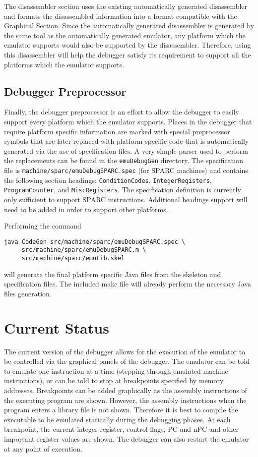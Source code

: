 The disassembler section uses the existing automatically generated disassembler 
and formats the disassembled information into a format compatible with the 
Graphical Section. Since the automatically generated disassembler is generated 
by the same tool as the automatically generated emulator, any platform which the
emulator supports would also be supported by the disassembler. Therefore, using
this disassembler will help the debugger satisfy its requirement to support all
the platforms which the emulator supports.


\subsection{Debugger Preprocessor}

Finally, the debugger preprocessor is an effort to allow the debugger to easily 
support every platform which the emulator supports. Places in the debugger that 
require platform specific information are marked with special preprocessor 
symbols that are later replaced with platform specific code that is  
automatically generated via the use of specification files. A very simple parser
used to perform the replacements can be found in the \texttt{emuDebugGen} 
directory. The specification file is \texttt{machine/sparc/emuDebugSPARC.spec} 
(for SPARC machines) and contains the following section headings: 
\texttt{ConditionCodes}, \texttt{IntegerRegisters}, \texttt{ProgramCounter}, 
and \texttt{MiscRegisters}.  The specification definition is currently 
only sufficient to support SPARC instructions. Additional headings support will 
need to be added in order to support other platforms.

Performing the command

\begin{verbatim}
java CodeGen src/machine/sparc/emuDebugSPARC.spec \
     src/machine/sparc/emuDebugSPARC.m \
     src/machine/sparc/emuLib.skel
\end{verbatim}

will generate the final platform specific Java files from the skeleton and 
specification files. The included make file will already perform the necessary 
Java files generation.

\section{Current Status}
The current version of the debugger allows for the execution of the emulator to 
be controlled via the graphical panels of the debugger. The emulator can be told
to emulate one instruction at a time (stepping through emulated machine 
instructions), or can be told to stop at breakpoints specified by memory 
addresses. Breakpoints can be added graphically as the assembly instructions of 
the executing program are shown. However, the assembly instructions when the 
program enters a library file is not shown. Therefore it is best to compile the 
executable to be emulated statically during the debugging phases. At each 
breakpoint, the current integer register, control flags, PC and nPC and other 
important register values are shown. The debugger can also restart the emulator
at any point of execution.

